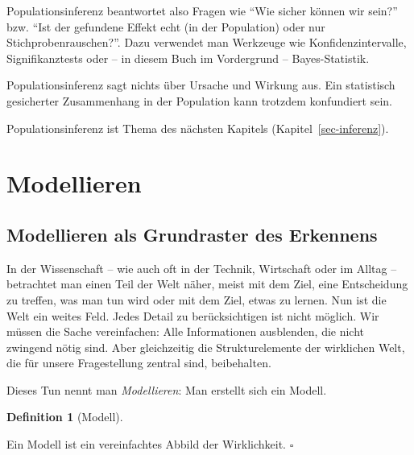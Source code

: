 \documentclass[
  ngerman,
  letterpaper,
  twoside,
  open=any]{scrbook}
\theoremstyle{definition}
\theoremstyle{plain}
\theoremstyle{definition}
\theoremstyle{definition}
\newtheorem{definition}{Definition}[chapter]
\theoremstyle{remark}
\begin{document}
Populationsinferenz beantwortet also Fragen wie \enquote{Wie sicher
können wir sein?} bzw. \enquote{Ist der gefundene Effekt echt (in der
Population) oder nur Stichprobenrauschen?}. Dazu verwendet man Werkzeuge
wie Konfidenzintervalle, Signifikanztests oder -- in diesem Buch im
Vordergrund -- Bayes-Statistik.

\begin{tcolorbox}[enhanced jigsaw, arc=.35mm, bottomrule=.15mm, bottomtitle=1mm, breakable, colback=white, colbacktitle=quarto-callout-important-color!10!white, colframe=quarto-callout-important-color-frame, coltitle=black, left=2mm, leftrule=.75mm, opacityback=0, opacitybacktitle=0.6, rightrule=.15mm, title=\textcolor{quarto-callout-important-color}{\faExclamation}\hspace{0.5em}{Wichtig}, titlerule=0mm, toprule=.15mm, toptitle=1mm]

Populationsinferenz sagt nichts über Ursache und Wirkung aus. Ein
statistisch gesicherter Zusammenhang in der Population kann trotzdem
konfundiert sein.

\end{tcolorbox}

Populationsinferenz ist Thema des nächsten Kapitels
(Kapitel~\ref{sec-inferenz}).

\section{Modellieren}\label{modellieren}

\subsection{Modellieren als Grundraster des
Erkennens}\label{modellieren-als-grundraster-des-erkennens}

In der Wissenschaft -- wie auch oft in der Technik, Wirtschaft oder im
Alltag -- betrachtet man einen Teil der Welt näher, meist mit dem Ziel,
eine Entscheidung zu treffen, was man tun wird oder mit dem Ziel, etwas
zu lernen. Nun ist die Welt ein weites Feld. Jedes Detail zu
berücksichtigen ist nicht möglich. Wir müssen die Sache vereinfachen:
Alle Informationen ausblenden, die nicht zwingend nötig sind. Aber
gleichzeitig die Strukturelemente der wirklichen Welt, die für unsere
Fragestellung zentral sind, beibehalten.

Dieses Tun nennt man \emph{Modellieren}: Man erstellt sich ein Modell.

\begin{definition}[Modell]\protect\hypertarget{def-model}{}\label{def-model}

Ein Modell ist ein vereinfachtes Abbild der Wirklichkeit. \(\square\)

\end{definition}
\end{document}
